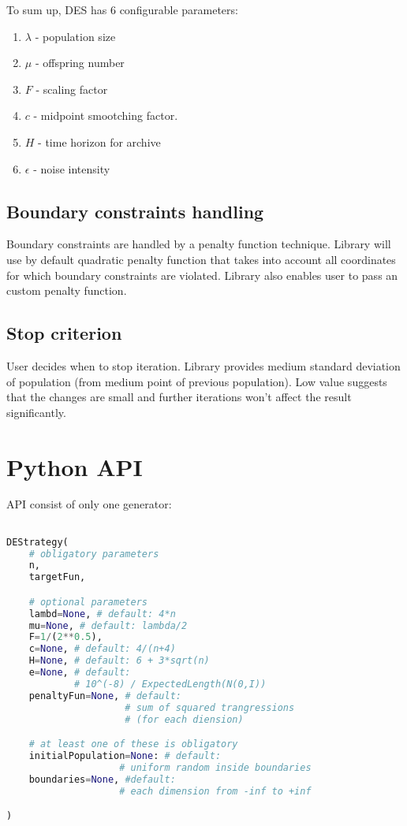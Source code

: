\documentclass[11pt,a4paper]{article}
\begin{document}
To sum up, DES has 6 configurable parameters:
\begin{enumerate}
\item $\lambda$ - population size
\item $\mu$ - offspring number
\item $F$ - scaling factor
\item $c$ - midpoint smootching factor.
\item $H$ - time horizon for archive
\item $\epsilon$ - noise intensity
\end{enumerate}

\subsection{Boundary constraints handling}\label{subsec:constraints}

Boundary constraints are handled by a penalty function technique.
Library will use by default quadratic penalty function that takes into account all coordinates for which boundary constraints are violated.
Library also enables user to pass an custom penalty function.

\subsection{Stop criterion}\label{subsec:stop}
User decides when to stop iteration.
Library provides medium standard deviation of population (from medium point of previous population).
Low value suggests that the changes are small and further iterations won't affect the result significantly.

\section{Python API}\label{sec:api}
API consist of only one generator:


\begin{lstlisting}[language=Python]

DEStrategy(
    # obligatory parameters
    n,
    targetFun,

    # optional parameters
    lambd=None, # default: 4*n
    mu=None, # default: lambda/2
    F=1/(2**0.5),
    c=None, # default: 4/(n+4)
    H=None, # default: 6 + 3*sqrt(n)
    e=None, # default:
            # 10^(-8) / ExpectedLength(N(0,I))
    penaltyFun=None, # default:
                     # sum of squared trangressions
                     # (for each diension)

    # at least one of these is obligatory
    initialPopulation=None: # default:
                    # uniform random inside boundaries
    boundaries=None, #default:
                    # each dimension from -inf to +inf

)

\end{lstlisting}
\end{document}
